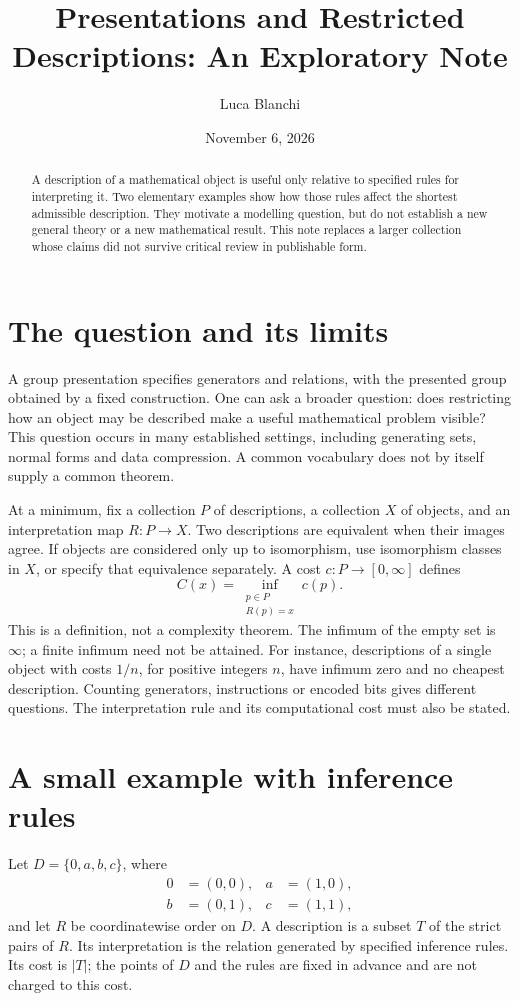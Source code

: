 \documentclass[11pt]{article}
\title{Presentations and Restricted Descriptions: An Exploratory Note}
\author{Luca Blanchi}
\date{November 6, 2026}
\begin{document}
\maketitle
\begin{abstract}
A description of a mathematical object is useful only relative to specified
rules for interpreting it. Two elementary examples show how those rules affect
the shortest admissible description. They motivate a modelling question, but do
not establish a new general theory or a new mathematical result. This note
replaces a larger collection whose claims did not survive critical review in
publishable form.
\end{abstract}

\section{The question and its limits}
A group presentation specifies generators and relations, with the presented
group obtained by a fixed construction. One can ask a broader question: does
restricting how an object may be described make a useful mathematical problem
visible? This question occurs in many established settings, including generating
sets, normal forms and data compression. A common vocabulary does not by itself
supply a common theorem.

At a minimum, fix a collection $P$ of descriptions, a collection $X$ of objects,
and an interpretation map $R:P\to X$. Two descriptions are equivalent when their
images agree. If objects are considered only up to isomorphism, use isomorphism
classes in $X$, or specify that equivalence separately. A cost $c:P\to[0,\infty]$
defines
\[
C(x)=\inf_{\substack{p\in P\\R(p)=x}}c(p).
\]
This is a definition, not a complexity theorem. The infimum of the empty set is
$\infty$; a finite infimum need not be attained. For instance, descriptions of a
single object with costs $1/n$, for positive integers $n$, have infimum zero and
no cheapest description. Counting generators, instructions or encoded bits gives
different questions. The interpretation rule and its computational cost must
also be stated.

\section{A small example with inference rules}
Let $D=\{0,a,b,c\}$, where
\[
\begin{aligned}
0&=(0,0),& a&=(1,0),\\
b&=(0,1),& c&=(1,1),
\end{aligned}
\]
and let $R$ be coordinatewise order on $D$. A description is a subset $T$ of the
strict pairs of $R$. Its interpretation is the relation generated by specified
inference rules. Its cost is $|T|$; the points of $D$ and the rules are fixed in
advance and are not charged to this cost.
\end{document}
